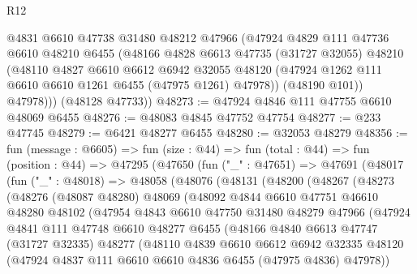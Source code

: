 \begin{lexlean}{R12}
\begin{coremodule}
          @4831
          @6610
          @47738
          @31480
          @48212
          @47966
          (@47924
            @4829
            @111
            @47736
            @6610
            @48210
            @6455
            (@48166
              @4828
              @6613
              @47735
              (@31727 @32055)
              @48210
              (@48110
                @4827
                @6610
                @6612
                @6942
                @32055
                @48120
                (@47924 @1262 @111 @6610 @6610 @1261 @6455 (@47975 @1261) @47978))
              (@48190 @101))
            @47978)))
      (@48128 @47733))
@48273 := @47924 @4846 @111 @47755 @6610 @48069 @6455
@48276 := @48083 @4845 @47752 @47754
@48277 := @233 @47745
@48279 := @6421 @48277 @6455
@48280 := @32053 @48279
@48356 := fun (message : @6605) =>
  fun (size : @44) =>
  fun (total : @44) =>
  fun (position : @44) =>
  @47295
    (@47650
      (fun ("_" : @47651) =>
      @47691
        (@48017
          (fun ("_" : @48018) =>
          @48058
            (@48076
              (@48131
                (@48200
                  (@48267
                    (@48273
                      (@48276
                        (@48087 @48280)
                        @48069
                        (@48092
                          @4844
                          @6610
                          @47751
                          @46610
                          @48280
                          @48102
                          (@47954
                            @4843
                            @6610
                            @47750
                            @31480
                            @48279
                            @47966
                            (@47924
                              @4841
                              @111
                              @47748
                              @6610
                              @48277
                              @6455
                              (@48166
                                @4840
                                @6613
                                @47747
                                (@31727 @32335)
                                @48277
                                (@48110
                                  @4839
                                  @6610
                                  @6612
                                  @6942
                                  @32335
                                  @48120
                                  (@47924 @4837 @111 @6610 @6610 @4836 @6455 (@47975 @4836) @47978))

\end{coremodule}
\end{lexlean}
